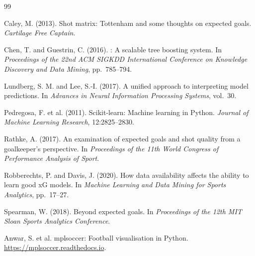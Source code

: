 \documentclass[12pt,a4paper]{article}
\begin{document}

\begin{thebibliography}{99}

Caley, M. (2013).
\newblock Shot matrix: {Tottenham} and some thoughts on expected goals.
\newblock \emph{Cartilage Free Captain}.

Chen, T. and Guestrin, C. (2016).
: A scalable tree boosting system.
\newblock In \emph{Proceedings of the 22nd ACM SIGKDD International Conference on Knowledge Discovery and Data Mining}, pp.\ 785--794.

Lundberg, S. M. and Lee, S.-I. (2017).
\newblock A unified approach to interpreting model predictions.
\newblock In \emph{Advances in Neural Information Processing Systems}, vol.\ 30.

Pedregosa, F. et al. (2011).
\newblock Scikit-learn: Machine learning in {Python}.
\newblock \emph{Journal of Machine Learning Research}, 12:2825--2830.

Rathke, A. (2017).
\newblock An examination of expected goals and shot quality from a goalkeeper's perspective.
\newblock In \emph{Proceedings of the 11th World Congress of Performance Analysis of Sport}.

Robberechts, P. and Davis, J. (2020).
\newblock How data availability affects the ability to learn good {xG} models.
\newblock In \emph{Machine Learning and Data Mining for Sports Analytics}, pp.\ 17--27.

Spearman, W. (2018).
\newblock Beyond expected goals.
\newblock In \emph{Proceedings of the 12th MIT Sloan Sports Analytics Conference}.

Anwar, S. et al.
\newblock mplsoccer: Football visualisation in {Python}.
\newblock \url{https://mplsoccer.readthedocs.io}.

\end{thebibliography}
\end{document}
